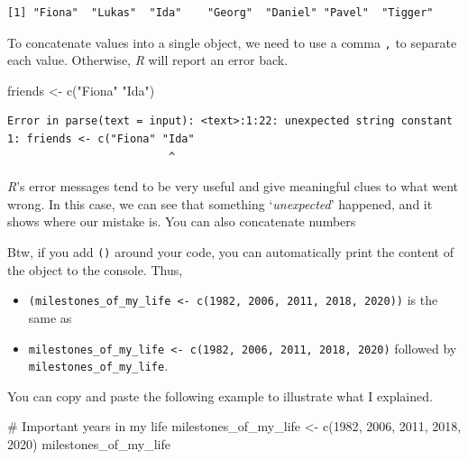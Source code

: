 \documentclass[
  letterpaper,
]{krantz}
\makeatletter
\newenvironment{Shaded}{\begin{snugshade}}{\end{snugshade}}
\newcommand{\CommentTok}[1]{\textcolor[rgb]{0.37,0.37,0.37}{#1}}
\newcommand{\DecValTok}[1]{\textcolor[rgb]{0.68,0.00,0.00}{#1}}
\newcommand{\FunctionTok}[1]{\textcolor[rgb]{0.28,0.35,0.67}{#1}}
\newcommand{\NormalTok}[1]{\textcolor[rgb]{0.00,0.23,0.31}{#1}}
\newcommand{\OtherTok}[1]{\textcolor[rgb]{0.00,0.23,0.31}{#1}}
\newcommand{\StringTok}[1]{\textcolor[rgb]{0.13,0.47,0.30}{#1}}
\newenvironment{kframe}{%
\medskip{}
\setlength{\fboxsep}{.8em}
 \def\at@end@of@kframe{}%
 \ifinner\ifhmode%
  \def\at@end@of@kframe{\end{minipage}}%
  \begin{minipage}{\columnwidth}%
 \fi\fi%
 \def\FrameCommand##1{\hskip\@totalleftmargin \hskip-\fboxsep
 \colorbox{shadecolor}{##1}\hskip-\fboxsep
     \hskip-\linewidth \hskip-\@totalleftmargin \hskip\columnwidth}%
 \MakeFramed {\advance\hsize-\width
   \@totalleftmargin\z@ \linewidth\hsize
   \@setminipage}}%
 {\par\unskip\endMakeFramed%
 \at@end@of@kframe}
\renewenvironment{Shaded}{\begin{kframe}}{\end{kframe}}
\makeatother
\begin{document}
\begin{verbatim}
[1] "Fiona"  "Lukas"  "Ida"    "Georg"  "Daniel" "Pavel"  "Tigger"
\end{verbatim}

To concatenate values into a single object, we need to use a comma
\texttt{,} to separate each value. Otherwise, \emph{R} will report an
error back.

\begin{Shaded}
\begin{Highlighting}[]
\NormalTok{friends }\OtherTok{\textless{}{-}} \FunctionTok{c}\NormalTok{(}\StringTok{"Fiona"} \StringTok{"Ida"}\NormalTok{)}
\end{Highlighting}
\end{Shaded}

\begin{verbatim}
Error in parse(text = input): <text>:1:22: unexpected string constant
1: friends <- c("Fiona" "Ida"
                         ^
\end{verbatim}

\emph{R}'s error messages tend to be very useful and give meaningful
clues to what went wrong. In this case, we can see that something
`\emph{unexpected}' happened, and it shows where our mistake is. You can
also concatenate numbers

Btw, if you add \texttt{()} around your code, you can automatically
print the content of the object to the console. Thus,

\begin{itemize}
\item
  \texttt{(milestones\_of\_my\_life\ \textless{}-\ c(1982,\ 2006,\ 2011,\ 2018,\ 2020))}
  is the same as
\item
  \texttt{milestones\_of\_my\_life\ \textless{}-\ c(1982,\ 2006,\ 2011,\ 2018,\ 2020)}
  followed by \texttt{milestones\_of\_my\_life}.
\end{itemize}

You can copy and paste the following example to illustrate what I
explained.

\begin{Shaded}
\begin{Highlighting}[]
\CommentTok{\# Important years in my life}
\NormalTok{milestones\_of\_my\_life }\OtherTok{\textless{}{-}} \FunctionTok{c}\NormalTok{(}\DecValTok{1982}\NormalTok{, }\DecValTok{2006}\NormalTok{, }\DecValTok{2011}\NormalTok{, }\DecValTok{2018}\NormalTok{, }\DecValTok{2020}\NormalTok{)}
\NormalTok{milestones\_of\_my\_life}
\end{Highlighting}
\end{Shaded}
\end{document}
